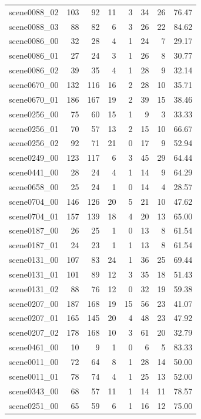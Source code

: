 \begin{table}[t]
\begin{tabular}{lrrrrrrr}
scene0088\_02 & 103 & 92 & 11 & 3 & 34 & 26 & 76.47 \\
scene0088\_03 & 88 & 82 & 6 & 3 & 26 & 22 & 84.62 \\
scene0086\_00 & 32 & 28 & 4 & 1 & 24 & 7 & 29.17 \\
scene0086\_01 & 27 & 24 & 3 & 1 & 26 & 8 & 30.77 \\
scene0086\_02 & 39 & 35 & 4 & 1 & 28 & 9 & 32.14 \\
scene0670\_00 & 132 & 116 & 16 & 2 & 28 & 10 & 35.71 \\
scene0670\_01 & 186 & 167 & 19 & 2 & 39 & 15 & 38.46 \\
scene0256\_00 & 75 & 60 & 15 & 1 & 9 & 3 & 33.33 \\
scene0256\_01 & 70 & 57 & 13 & 2 & 15 & 10 & 66.67 \\
scene0256\_02 & 92 & 71 & 21 & 0 & 17 & 9 & 52.94 \\
scene0249\_00 & 123 & 117 & 6 & 3 & 45 & 29 & 64.44 \\
scene0441\_00 & 28 & 24 & 4 & 1 & 14 & 9 & 64.29 \\
scene0658\_00 & 25 & 24 & 1 & 0 & 14 & 4 & 28.57 \\
scene0704\_00 & 146 & 126 & 20 & 5 & 21 & 10 & 47.62 \\
scene0704\_01 & 157 & 139 & 18 & 4 & 20 & 13 & 65.00 \\
scene0187\_00 & 26 & 25 & 1 & 0 & 13 & 8 & 61.54 \\
scene0187\_01 & 24 & 23 & 1 & 1 & 13 & 8 & 61.54 \\
scene0131\_00 & 107 & 83 & 24 & 1 & 36 & 25 & 69.44 \\
scene0131\_01 & 101 & 89 & 12 & 3 & 35 & 18 & 51.43 \\
scene0131\_02 & 88 & 76 & 12 & 0 & 32 & 19 & 59.38 \\
scene0207\_00 & 187 & 168 & 19 & 15 & 56 & 23 & 41.07 \\
scene0207\_01 & 165 & 145 & 20 & 4 & 48 & 23 & 47.92 \\
scene0207\_02 & 178 & 168 & 10 & 3 & 61 & 20 & 32.79 \\
scene0461\_00 & 10 & 9 & 1 & 0 & 6 & 5 & 83.33 \\
scene0011\_00 & 72 & 64 & 8 & 1 & 28 & 14 & 50.00 \\
scene0011\_01 & 78 & 74 & 4 & 1 & 25 & 13 & 52.00 \\
scene0343\_00 & 68 & 57 & 11 & 1 & 14 & 11 & 78.57 \\
scene0251\_00 & 65 & 59 & 6 & 1 & 16 & 12 & 75.00 \\

\end{tabular}
\end{table}
